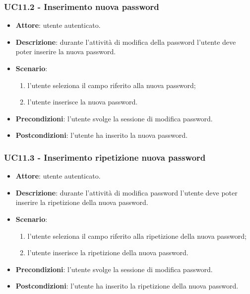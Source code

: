 \subsubsection{UC11.2 - Inserimento nuova password}
\begin{itemize}
    \item \textbf{Attore}: utente autenticato.
    \item \textbf{Descrizione}: durante l'attività di modifica della password l'utente deve poter inserire la nuova password.
    \item \textbf{Scenario}:
    \begin{enumerate}
        \item l'utente seleziona il campo riferito alla nuova password;
        \item l'utente inserisce la nuova password.
    \end{enumerate}

    \item \textbf{Precondizioni}: l'utente svolge la sessione di modifica password.
    \item \textbf{Postcondizioni}: l'utente ha inserito la nuova password.
\end{itemize}

\subsubsection{UC11.3 - Inserimento ripetizione nuova password}
\begin{itemize}
    \item \textbf{Attore}: utente autenticato.
    \item \textbf{Descrizione}: durante l'attività di modifica password l'utente deve poter inserire la ripetizione della nuova password.
    \item \textbf{Scenario}:
    \begin{enumerate}
        \item l'utente seleziona il campo riferito alla ripetizione della nuova password;
        \item l'utente inserisce la ripetizione della nuova password.
    \end{enumerate}

    \item \textbf{Precondizioni}: l'utente svolge la sessione di modifica password.
    \item \textbf{Postcondizioni}: l'utente ha inserito la ripetizione della nuova password.
\end{itemize}

